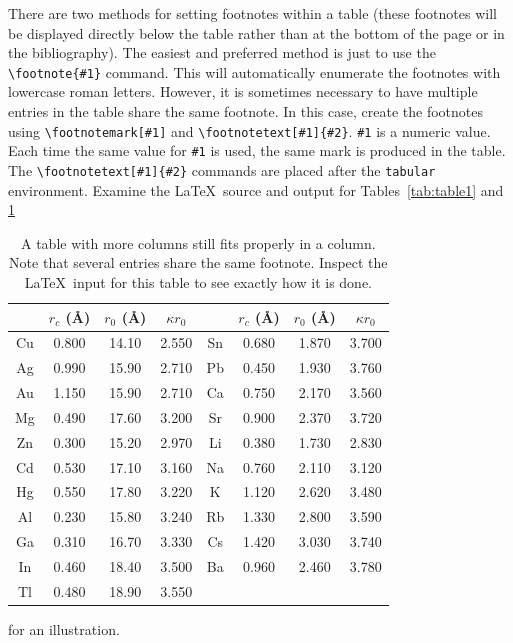 \documentclass[%
 aip,
 amsmath,amssymb,
reprint, onecolumn %
]{revtex4-1}
\begin{document}
There are two methods for setting footnotes within a table (these
footnotes will be displayed directly below the table rather than at
the bottom of the page or in the bibliography).
The easiest
and preferred method is just to use the \verb+\footnote{#1}+
command. This will automatically enumerate the footnotes with
lowercase roman letters.
However, it is sometimes necessary to have
multiple entries in the table share the same footnote.
In this case,
create the footnotes using
\verb+\footnotemark[#1]+ and \verb+\footnotetext[#1]{#2}+.
\texttt{\#1} is a numeric value.
Each time the same value for \texttt{\#1} is used, 
the same mark is produced in the table. 
The \verb+\footnotetext[#1]{#2}+ commands are placed after the \texttt{tabular}
environment. 
Examine the \LaTeX\ source and output for Tables~\ref{tab:table1} and 
\ref{tab:table2}%
\begin{table}
\caption{\label{tab:table2}A table with more columns still fits
properly in a column. Note that several entries share the same
footnote. Inspect the \LaTeX\ input for this table to see
exactly how it is done.}
\begin{ruledtabular}
\begin{tabular}{cccccccc}
 &$r_c$ (\AA)&$r_0$ (\AA)&$\kappa r_0$&
 &$r_c$ (\AA) &$r_0$ (\AA)&$\kappa r_0$\\
\hline
Cu& 0.800 & 14.10 & 2.550 &Sn\footnotemark[1]
& 0.680 & 1.870 & 3.700 \\
Ag& 0.990 & 15.90 & 2.710 &Pb\footnotemark[2]
& 0.450 & 1.930 & 3.760 \\
Au& 1.150 & 15.90 & 2.710 &Ca\footnotemark[3]
& 0.750 & 2.170 & 3.560 \\
Mg& 0.490 & 17.60 & 3.200 &Sr\footnotemark[4]
& 0.900 & 2.370 & 3.720 \\
Zn& 0.300 & 15.20 & 2.970 &Li\footnotemark[2]
& 0.380 & 1.730 & 2.830 \\
Cd& 0.530 & 17.10 & 3.160 &Na\footnotemark[5]
& 0.760 & 2.110 & 3.120 \\
Hg& 0.550 & 17.80 & 3.220 &K\footnotemark[5]
&  1.120 & 2.620 & 3.480 \\
Al& 0.230 & 15.80 & 3.240 &Rb\footnotemark[3]
& 1.330 & 2.800 & 3.590 \\
Ga& 0.310 & 16.70 & 3.330 &Cs\footnotemark[4]
& 1.420 & 3.030 & 3.740 \\
In& 0.460 & 18.40 & 3.500 &Ba\footnotemark[5]
& 0.960 & 2.460 & 3.780 \\
Tl& 0.480 & 18.90 & 3.550 & & & & \\
\end{tabular}
\end{ruledtabular}
\end{table}
for an illustration. 
\end{document}
